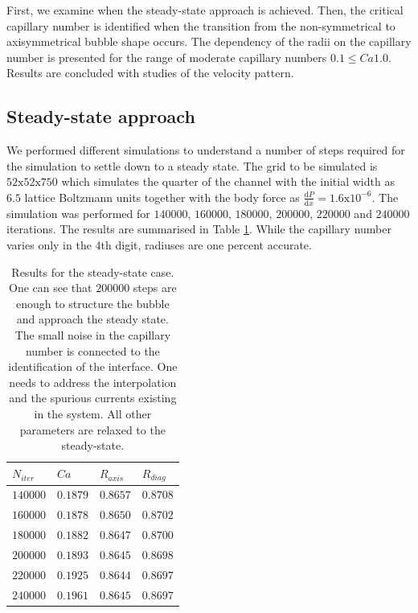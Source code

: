 \documentclass{article}
\begin{document}
First, we examine when the steady-state approach is
achieved. Then, the critical capillary number is identified when the transition from the
non-symmetrical to axisymmetrical bubble shape occurs. The dependency of the radii on the capillary
number is presented for the range of moderate capillary numbers $0.1 \leq Ca 1.0$. Results are
concluded with studies of the velocity pattern.

\subsection{Steady-state approach}
\label{sec:steady:state}
We performed different simulations to understand a number of steps required for the simulation to
settle down to a steady state. The grid to be simulated is $52\mathrm{x}52\mathrm{x}750$ which simulates the
quarter of the channel with the initial
width as $6.5$ lattice Boltzmann units together with the body force as
$\frac{\mathrm{d}P}{\mathrm{d}x}=1.6
\mathrm{x}10^{-6}$. The simulation was performed for $140000$, $160000$, $180000$, $200000$,
$220000$ and
$240000$ iterations. The results are summarised in Table \ref{table:steady:state}. While the
capillary number varies only in the 4th digit, radiuses are one percent accurate. 
\begin{table}
\begin{tabularx}{\textwidth}{|X|X|X|X|}
\hline
$N_{iter}$&$Ca$&$R_{axis}$&$R_{diag}$\\
\hline
$140000$&$0.1879$&$0.8657$&$0.8708$\\
$160000$&$0.1878$&$0.8650$&$0.8702$\\
$180000$&$0.1882$&$0.8647$&$0.8700$\\
$200000$&$0.1893$&$0.8645$&$0.8698$\\
$220000$&$0.1925$&$0.8644$&$0.8697$\\
$240000$&$0.1961$&$0.8645$&$0.8697$\\
\hline
\end{tabularx}
\caption{Results for the steady-state case. One
can see that $200000$ steps are enough to structure
the bubble and approach the steady state. The small noise in the capillary number is connected to
the identification of the interface. One needs to address the interpolation and the spurious
currents existing in the system. All other parameters are relaxed to the
steady-state.\label{table:steady:state}}
\end{table}
\end{document}
